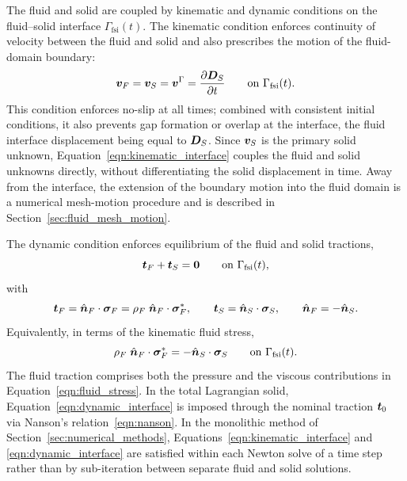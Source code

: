 The fluid and solid are coupled by kinematic and dynamic conditions on the fluid--solid interface $\Gamma_\text{fsi}(t)$.
The kinematic condition enforces continuity of velocity between the fluid and solid and also prescribes the motion of the fluid-domain boundary:
\begin{equation}
    \boldsymbol{v}_F
    =
    \boldsymbol{v}_S
    =
    \boldsymbol{v}^{\Gamma}
    =
    \frac{\partial \boldsymbol{D}_S}{\partial t}
    \qquad
    \text{on } \Gamma_\text{fsi}(t).
    \label{eqn:kinematic_interface}
\end{equation}
This condition enforces no-slip at all times; combined with consistent initial conditions, it also prevents gap formation or overlap at the interface, the fluid interface displacement being equal to $\boldsymbol{D}_S$.
Since $\boldsymbol{v}_S$ is the primary solid unknown, Equation~\eqref{eqn:kinematic_interface} couples the fluid and solid unknowns directly, without differentiating the solid displacement in time.
Away from the interface, the extension of the boundary motion into the fluid domain is a numerical mesh-motion procedure and is described in Section~\ref{sec:fluid_mesh_motion}.

The dynamic condition enforces equilibrium of the fluid and solid tractions,
\begin{equation}
    \boldsymbol{t}_F + \boldsymbol{t}_S = \boldsymbol{0} \qquad \text{on } \Gamma_\text{fsi}(t),
    \label{eqn:dynamic_interface_compact}
\end{equation}
with
\begin{equation}
    \boldsymbol{t}_F = \hat{\boldsymbol{n}}_F \cdot \boldsymbol{\sigma}_F = \rho_F \; \hat{\boldsymbol{n}}_F \cdot \boldsymbol{\sigma}_F^* ,
    \qquad \boldsymbol{t}_S = \hat{\boldsymbol{n}}_S \cdot \boldsymbol{\sigma}_S,
    \qquad \hat{\boldsymbol{n}}_F = -\hat{\boldsymbol{n}}_S.
\end{equation}
Equivalently, in terms of the kinematic fluid stress,
\begin{equation}
    \rho_F \; \hat{\boldsymbol{n}}_F \cdot \boldsymbol{\sigma}_F^* = -\hat{\boldsymbol{n}}_S \cdot \boldsymbol{\sigma}_S \qquad \text{on } \Gamma_\text{fsi}(t).
    \label{eqn:dynamic_interface}
\end{equation}
The fluid traction comprises both the pressure and the viscous contributions in Equation~\eqref{eqn:fluid_stress}.
In the total Lagrangian solid, Equation~\eqref{eqn:dynamic_interface} is imposed through the nominal traction $\boldsymbol{t}_0$ via Nanson's relation~\eqref{eqn:nanson}.
In the monolithic method of Section~\ref{sec:numerical_methods}, Equations~\eqref{eqn:kinematic_interface} and \eqref{eqn:dynamic_interface} are satisfied within each Newton solve of a time step rather than by sub-iteration between separate fluid and solid solutions.
